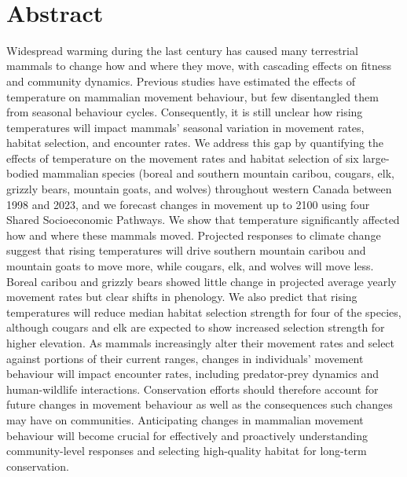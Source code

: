 \documentclass[
  12pt,
]{article}
\begin{document}
~

\clearpage

\section*{Abstract}\label{abstract}

\noindent Widespread warming during the last century has caused many terrestrial mammals to change how and where they move, with cascading effects on fitness and community dynamics. Previous studies have estimated the effects of temperature on mammalian movement behaviour, but few disentangled them from seasonal behaviour cycles. Consequently, it is still unclear how rising temperatures will impact mammals' seasonal variation in movement rates, habitat selection, and encounter rates. We address this gap by quantifying the effects of temperature on the movement rates and habitat selection of six large-bodied mammalian species (boreal and southern mountain caribou, cougars, elk, grizzly bears, mountain goats, and wolves) throughout western Canada between 1998 and 2023, and we forecast changes in movement up to 2100 using four Shared Socioeconomic Pathways. We show that temperature significantly affected how and where these mammals moved. Projected responses to climate change suggest that rising temperatures will drive southern mountain caribou and mountain goats to move more, while cougars, elk, and wolves will move less. Boreal caribou and grizzly bears showed little change in projected average yearly movement rates but clear shifts in phenology. We also predict that rising temperatures will reduce median habitat selection strength for four of the species, although cougars and elk are expected to show increased selection strength for higher elevation. As mammals increasingly alter their movement rates and select against portions of their current ranges, changes in individuals' movement behaviour will impact encounter rates, including predator-prey dynamics and human-wildlife interactions. Conservation efforts should therefore account for future changes in movement behaviour as well as the consequences such changes may have on communities. Anticipating changes in mammalian movement behaviour will become crucial for effectively and proactively understanding community-level responses and selecting high-quality habitat for long-term conservation.

\newpage

\doublespacing

\linenumbers
\end{document}
